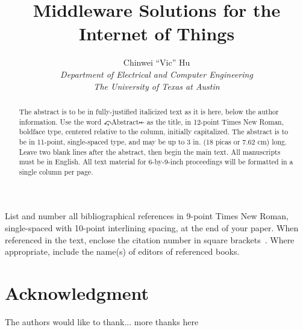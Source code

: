 \documentclass[11pt,onecolumn]{article}
\begin{document}
%
\title{Middleware Solutions for the Internet of Things}



\author{
Chinwei ``Vic'' Hu\\
{\small \textit{Department of Electrical and Computer Engineering} }\\
{\small \textit{The University of Texas at Austin}}
}


\maketitle


\begin{abstract}
The abstract is to be in fully-justified italicized text as it is here, below the author information. Use the word ⤽Abstract⤝ as the title, in 12-point Times New Roman, boldface type, centered relative to the column, initially capitalized. The abstract is to be in 11-point, single-spaced type, and may be up to 3 in. (18 picas or 7.62 cm) long. Leave two blank lines after the abstract, then begin the main text. All manuscripts must be in English. All text material for 6-by-9-inch proceedings will be formatted in a single column per page.
\end{abstract}





{}
List and number all bibliographical references in 9-point Times New Roman, single-spaced with 10-point interlining spacing, at the end of your paper. When referenced in the text, enclose the citation number in square brackets~\cite{IEEEhowto:kopka}. Where appropriate, include the name(s) of editors of referenced books.

\section*{Acknowledgment}
The authors would like to thank...
more thanks here

\end{document}
